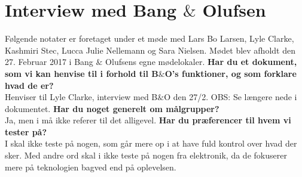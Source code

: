 \chapter{Interview med Bang $\&$ Olufsen}
\label{app:InterviewLyleClarke}
%
Følgende notater er foretaget under et møde med Lars Bo Larsen, Lyle Clarke, Kashmiri Stec, Lucca Julie Nellemann og Sara Nielsen. Mødet blev afholdt den 27.  Februar 2017 i Bang $\&$ Olufsens egne mødelokaler. \blankline
% 
\textbf{Har du et dokument, som vi kan henvise til i forhold til B$\&$O’s funktioner, og som forklare hvad de er?}\\
Henviser til Lyle Clarke, interview med B$\&$O den 27/2. OBS: Se længere nede i dokumentet.\blankline
%
\textbf{Har du noget generelt om målgrupper?}\\ 
Ja, men i må ikke referer til det alligevel. \blankline
%
\textbf{Har du præferencer til hvem vi tester på?}\\
I skal ikke teste på nogen, som går mere op i at have fuld kontrol over hvad der sker. Med andre ord skal i ikke teste på nogen fra elektronik, da de fokuserer mere på teknologien bagved end på oplevelsen. 

